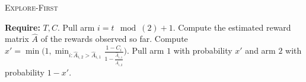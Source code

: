 \begin{algorithm}
\caption{\textsc{Explore-First}}
\label{algOne-EF}
\begin{algorithmic}[1]
\STATE \textbf{Require:} $T, C$.
\STATE Pull arm $i = t\mod(2)+1$. %
\ENDFOR 
 \STATE Compute the estimated reward matrix $\widehat{A}$ of the rewards observed so far.
\STATE Compute $x'=\min \Bigg ( 1, \min_{ i: \widehat{A}_{i,2} > \widehat{A}_{i,1} }\frac{1 - C_i}{1 - \frac{\widehat{A}_{i,1}}{\widehat{A}_{i,2}} }\Bigg ).$
\STATE  Pull arm $1$ with probability $x'$   and   arm $2$ 
with probability $1-x'$.     
\ENDFOR 
 \end{algorithmic}
\end{algorithm}

\iffalse 
\begin{algorithm}[H]
\SetAlgoLined
  \KwIn{ $T, c$ }
\caption{\textsc{Explore-First}}
\label{algOne-EF}
\For{$t = 1,2, \cdots \lfloor T^{\alpha} \rfloor $}{ 
- Pull arm $1$ with probability $1/2$  
}
Compute the estimated reward matrix $\widehat{A}$ of the rewards observed so far \\
Compute the probability$(x^t)=\min_{ i: \widehat{a}_{i,2} > \widehat{a}_{i,1} } \Bigg ( 1, \frac{1 - c_i}{1 - \frac{\widehat{a}_{i,1}}{\widehat{a}_{i,2}} }\Bigg )$\\
\For{$t = \lfloor T^{\alpha} \rfloor + 1, \lfloor T^{\alpha} \rfloor + 2, \cdots  T $}{ 
- Pull arm $1$ with probability $x^t$  
} 
 \end{algorithm}
 \fi 
 
